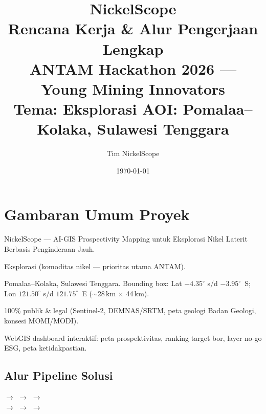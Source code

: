 \documentclass[11pt,a4paper]{article}
\title{\color{antamblue}\textbf{NickelScope}\\[0.3em]
\large Rencana Kerja \& Alur Pengerjaan Lengkap\\[0.2em]
\normalsize ANTAM Hackathon 2026 --- Young Mining Innovators\\
\normalsize Tema: Eksplorasi \textbar{} AOI: Pomalaa--Kolaka, Sulawesi Tenggara}
\author{Tim NickelScope}
\date{\today}
\begin{document}
\maketitle
\thispagestyle{empty}

\begin{center}
\end{center}

\vspace{0.5em}
\tableofcontents
\newpage

\section{Gambaran Umum Proyek}
\label{sec:overview}

\begin{description}[leftmargin=3.2cm, style=nextline]
  \item[\textbf{Judul}] NickelScope --- AI-GIS Prospectivity Mapping untuk
        Eksplorasi Nikel Laterit Berbasis Penginderaan Jauh.
  \item[\textbf{Tema}] Eksplorasi (komoditas nikel --- prioritas utama ANTAM).
  \item[\textbf{AOI}] Pomalaa--Kolaka, Sulawesi Tenggara.
        Bounding box: Lat $-4.35^\circ$ s/d $-3.95^\circ$~S;
        Lon $121.50^\circ$ s/d $121.75^\circ$~E ($\sim$28\,km $\times$ 44\,km).
  \item[\textbf{Data}] 100\% publik \& legal (Sentinel-2, DEMNAS/SRTM,
        peta geologi Badan Geologi, konsesi MOMI/MODI).
  \item[\textbf{Output}] WebGIS dashboard interaktif: peta prospektivitas,
        ranking target bor, layer no-go ESG, peta ketidakpastian.
\end{description}

\subsection*{Alur Pipeline Solusi}
\begin{center}\footnotesize
{} $\rightarrow$  $\rightarrow$
 $\rightarrow$ \\[0.4em]
$\rightarrow$  $\rightarrow$
 $\rightarrow$ 
\end{center}
\end{document}
